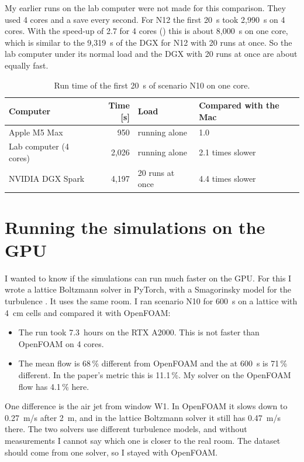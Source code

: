 My earlier runs on the lab computer were not made for this comparison. They used 4 cores and a save every
second. For N12 the first 20~s took 2,990~s on 4 cores. With the speed-up of 2.7 for 4 cores
() this is about 8,000~s on one core, which is similar to the 9,319~s of the DGX for N12 with
20 runs at once. So the lab computer under its normal load and the DGX with 20 runs at once are about equally fast.

\begin{table}[h]
  \centering
  \caption[Run time of the N10 test.]{Run time of the first 20~s of scenario N10 on one core.}
  \label{tab:bench}
  \begin{tabular}{lrll}
    \toprule
    Computer & Time [s] & Load & Compared with the Mac\\
    \midrule
    Apple M5 Max & 950 & running alone & 1.0\\
    Lab computer (4 cores) & 2,026 & running alone & 2.1 times slower\\
    NVIDIA DGX Spark & 4,197 & 20 runs at once & 4.4 times slower\\
    \bottomrule
  \end{tabular}
\end{table}

\section{Running the simulations on the GPU}
I wanted to know if the simulations can run much faster on the GPU. For this I wrote a lattice Boltzmann
solver in PyTorch, with a Smagorinsky model for the turbulence \citep{smagorinsky1963,kruger2017}. It uses the
same room. I ran scenario N10 for 600~s on a lattice with 4~cm cells and compared it with OpenFOAM:
\begin{itemize}
  \item The run took 7.3~hours on the RTX A2000. This is not faster than OpenFOAM on 4 cores.
  \item The mean flow is 68\,\% different from OpenFOAM and the \cotwo{} at 600~s is 71\,\% different. In the
        paper's metric this is 11.1\,\%. My \cotwo{} solver on the OpenFOAM flow has 4.1\,\% here.
\end{itemize}
One difference is the air jet from window W1. In OpenFOAM it slows down to 0.27~m/s after 2~m, and in the
lattice Boltzmann solver it still has 0.47~m/s there. The two solvers use different turbulence models, and
without measurements I cannot say which one is closer to the real room. The dataset should come from one
solver, so I stayed with OpenFOAM.

